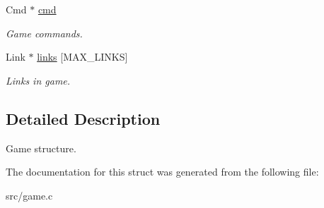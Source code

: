 \begin{DoxyCompactItemize}
Cmd $\ast$ \hyperlink{struct__Game_ac98c89af82c9ffde3f17e7f4929bb97c}{cmd}
\begin{DoxyCompactList}\small\item\em Game commands. \end{DoxyCompactList}\item 
\mbox{\label{struct__Game_a2b766f0814f66dcf437600a9c526142e}} 
Link $\ast$ \hyperlink{struct__Game_a2b766f0814f66dcf437600a9c526142e}{links} \mbox{[}M\+A\+X\+\_\+\+L\+I\+N\+KS\mbox{]}
\begin{DoxyCompactList}\small\item\em Links in game. \end{DoxyCompactList}\end{DoxyCompactItemize}


\subsection{Detailed Description}
Game structure. 

The documentation for this struct was generated from the following file\+:\begin{DoxyCompactItemize}
\item 
src/game.\+c\end{DoxyCompactItemize}
